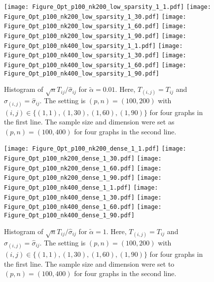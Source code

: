 \documentclass[review]{elsarticle}
\newcommand{\1}{{\bf 1}}
\newcommand{\0}{{\bf 0}}
\begin{document}
\begin{figure}[htbp]
	\begin{center}
        \texttt{[image: Figure\_Opt\_p100\_nk200\_low\_sparsity\_1\_1.pdf]}
        \texttt{[image: Figure\_Opt\_p100\_nk200\_low\_sparsity\_1\_30.pdf]}
        \texttt{[image: Figure\_Opt\_p100\_nk200\_low\_sparsity\_1\_60.pdf]}
        \texttt{[image: Figure\_Opt\_p100\_nk200\_low\_sparsity\_1\_90.pdf]}
        \texttt{[image: Figure\_Opt\_p100\_nk400\_low\_sparsity\_1\_1.pdf]}
        \texttt{[image: Figure\_Opt\_p100\_nk400\_low\_sparsity\_1\_30.pdf]}
        \texttt{[image: Figure\_Opt\_p100\_nk400\_low\_sparsity\_1\_60.pdf]}
        \texttt{[image: Figure\_Opt\_p100\_nk400\_low\_sparsity\_1\_90.pdf]}
  \caption{\label{Fluctuation001}Histogram of $\sqrt{n}T_{ij}/\hat{\sigma}_{ij}$ for $\tilde\alpha=0.01$. Here, $T_{(i,j)}=T_{ij}$ and $\hat{\sigma}_{(i,j)}=\hat{\sigma}_{ij}$. The setting is $(p,n)=(100,200)$ with $(i,j)\in\{(1,1), (1,30), (1,60), (1,90)\}$ for four graphs in the first line. The sample size and dimension were set as $(p,n)=(100,400)$ for four graphs in the second line.}
        \end{center}
\end{figure}

\begin{figure}[htbp]
	\begin{center}
        \texttt{[image: Figure\_Opt\_p100\_nk200\_dense\_1\_1.pdf]}
        \texttt{[image: Figure\_Opt\_p100\_nk200\_dense\_1\_30.pdf]}
        \texttt{[image: Figure\_Opt\_p100\_nk200\_dense\_1\_60.pdf]}
        \texttt{[image: Figure\_Opt\_p100\_nk200\_dense\_1\_90.pdf]}
        \texttt{[image: Figure\_Opt\_p100\_nk400\_dense\_1\_1.pdf]}
        \texttt{[image: Figure\_Opt\_p100\_nk400\_dense\_1\_30.pdf]}
        \texttt{[image: Figure\_Opt\_p100\_nk400\_dense\_1\_60.pdf]}
        \texttt{[image: Figure\_Opt\_p100\_nk400\_dense\_1\_90.pdf]}
  \caption{\label{Fluctuation1}Histogram of $\sqrt{n}T_{ij}/\hat{\sigma}_{ij}$ for $\tilde\alpha=1$. Here, $T_{(i,j)}=T_{ij}$ and $\hat{\sigma}_{(i,j)}=\hat{\sigma}_{ij}$. The setting is $(p,n)=(100,200)$ with $(i,j)\in\{(1,1), (1,30), (1,60), (1,90)\}$ for four graphs in the first line. The sample size and dimension were set to $(p,n)=(100,400)$ for four graphs in the second line.}
        \end{center}
\end{figure}
\end{document}
